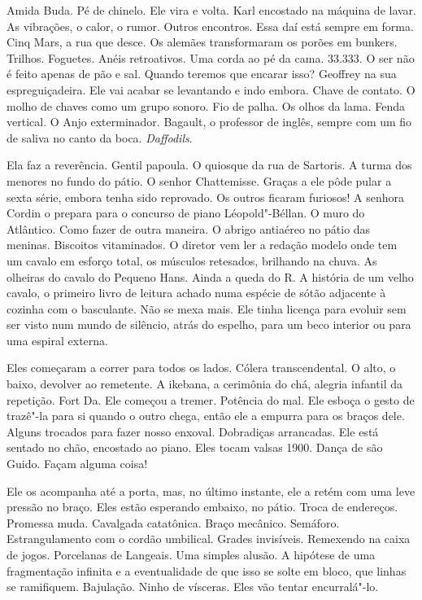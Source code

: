 Amida Buda. Pé de chinelo. Ele vira e volta. Karl encostado na máquina
de lavar. As vibrações, o calor, o rumor. Outros encontros. Essa daí
está sempre em forma. Cinq Mars, a rua que desce. Os alemães
transformaram os porões em bunkers. Trilhos. Foguetes. Anéis
retroativos. Uma corda ao pé da cama. 33.333. O ser não é feito apenas
de pão e sal. Quando teremos que encarar isso? Geoffrey na sua
espreguiçadeira. Ele vai acabar se levantando e indo embora. Chave de
contato. O molho de chaves como um grupo sonoro. Fio de palha. Os olhos
da lama. Fenda vertical. O Anjo exterminador. Bagault, o professor de
inglês, sempre com um fio de saliva no canto da boca. \emph{Daffodils}.

Ela faz a reverência. Gentil papoula. O quiosque da rua de Sartoris. A
turma dos menores no fundo do pátio. O senhor Chattemisse. Graças a ele
pôde pular a sexta série, embora tenha sido reprovado. Os outros ficaram
furiosos! A senhora Cordin o prepara para o concurso de piano
Léopold"-Béllan. O muro do Atlântico. Como fazer de outra maneira. O
abrigo antiaéreo no pátio das meninas. Biscoitos vitaminados. O diretor
vem ler a redação modelo onde tem um cavalo em esforço total, os
músculos retesados, brilhando na chuva. As olheiras do cavalo do Pequeno
Hans. Ainda a queda do R. A história de um velho cavalo, o primeiro
livro de leitura achado numa espécie de sótão adjacente à cozinha com o
basculante. Não se mexa mais. Ele tinha licença para evoluir sem ser
visto num mundo de silêncio, atrás do espelho, para um beco interior ou
para uma espiral externa.

Eles começaram a correr para todos os lados. Cólera transcendental. O
alto, o baixo, devolver ao remetente. A ikebana, a cerimônia do chá,
alegria infantil da repetição. Fort Da. Ele começou a tremer. Potência
do mal. Ele esboça o gesto de trazê"-la para si quando o outro chega,
então ele a empurra para os braços dele. Alguns trocados para fazer
nosso enxoval. Dobradiças arrancadas. Ele está sentado no chão,
encostado ao piano. Eles tocam valsas 1900. Dança de são Guido. Façam
alguma coisa!

Ele os acompanha até a porta, mas, no último instante, ele a retém com
uma leve pressão no braço. Eles estão esperando embaixo, no pátio.
Troca de endereços. Promessa muda. Cavalgada catatônica. Braço mecânico.
Semáforo. Estrangulamento com o cordão umbilical. Grades invisíveis.
Remexendo na caixa de jogos. Porcelanas de Langeais. Uma simples alusão.
A hipótese de uma fragmentação infinita e a eventualidade de que isso se
solte em bloco, que linhas se ramifiquem. Bajulação. Ninho de vísceras.
Eles vão tentar encurralá"-lo.

